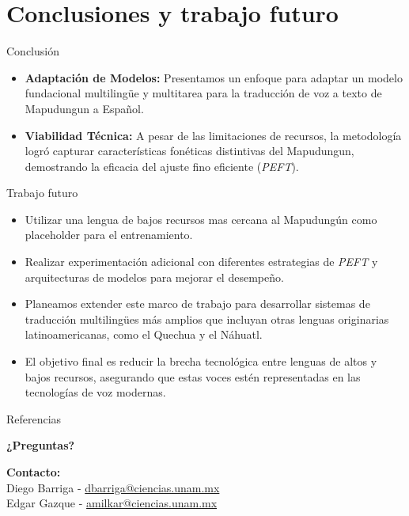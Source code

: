 \documentclass[11pt]{beamer}
\begin{document}
\section{Conclusiones y trabajo futuro}

\begin{frame}{Conclusión}
    \begin{itemize}
        \item \textbf{Adaptación de Modelos:} Presentamos un enfoque para adaptar un modelo fundacional multilingüe y multitarea para la traducción de voz a texto de Mapudungun a Español.
        \item \textbf{Viabilidad Técnica:} A pesar de las limitaciones de recursos, la metodología logró capturar características fonéticas distintivas del Mapudungun, demostrando la eficacia del ajuste fino eficiente (\textit{PEFT}).
    \end{itemize}
\end{frame}

\begin{frame}{Trabajo futuro}

    \begin{itemize}
        \item Utilizar una lengua de bajos recursos mas cercana al Mapudungún como placeholder para el entrenamiento.
        \item Realizar experimentación adicional con diferentes estrategias de \textit{PEFT} y arquitecturas de modelos para mejorar el desempeño.
        \item Planeamos extender este marco de trabajo para desarrollar sistemas de traducción multilingües más amplios que incluyan otras lenguas originarias latinoamericanas, como el Quechua y el Náhuatl.
        \item El objetivo final es \alert{reducir la brecha tecnológica entre lenguas} de altos y bajos recursos, asegurando que estas voces estén representadas en las tecnologías de voz modernas.
    \end{itemize}
\end{frame}

\begin{frame}[allowframebreaks]{Referencias}
	\small
    
    
\end{frame}

\begin{frame}
\centering
\Huge \textbf{¿Preguntas?}

\vspace{1cm}
\normalsize
\textbf{Contacto:} \\
Diego Barriga - \url{dbarriga@ciencias.unam.mx} \\
Edgar Gazque - \url{amilkar@ciencias.unam.mx}
\end{frame}
\end{document}
